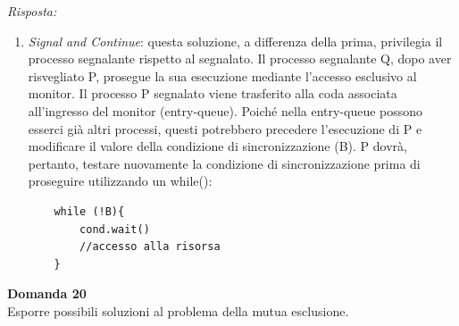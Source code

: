 \documentclass{article}
\newenvironment{problem}[2][Domanda]
    { \begin{mdframed}[backgroundcolor=gray!20] \textbf{#1 #2} \\}
    {  \end{mdframed}}
\newenvironment{solution}
    {\textit{Risposta:}}
    {}
\begin{document}
\begin{solution}
\begin{enumerate}
    \item  \emph{Signal and Continue}: questa soluzione, a differenza della prima, privilegia il processo segnalante rispetto al segnalato. Il processo segnalante Q, dopo aver risvegliato P, prosegue la sua esecuzione mediante l’accesso esclusivo al monitor. Il processo P segnalato viene trasferito alla coda associata all’ingresso del monitor (entry-queue).
    \newline
    Poiché nella entry-queue possono esserci già altri processi, questi potrebbero precedere l’esecuzione di P e modificare il valore della condizione di sincronizzazione (B).
    \newline
    P dovrà, pertanto, testare nuovamente la condizione di sincronizzazione prima di proseguire utilizzando un while():
    \begin{verbatim}
    while (!B){
        cond.wait()
        //accesso alla risorsa
    }
    \end{verbatim}
    \end{enumerate}
\end{solution}
\begin{problem}{20}
Esporre possibili soluzioni al problema della mutua esclusione.
\end{problem}
\end{document}
